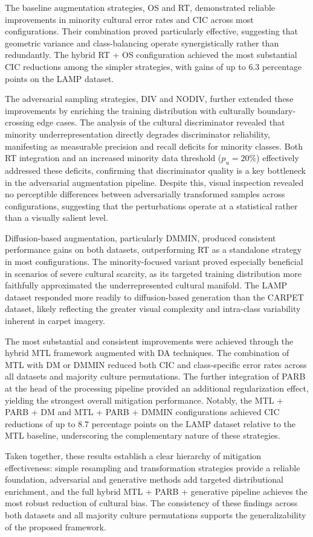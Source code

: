The baseline augmentation strategies, OS and RT, demonstrated reliable improvements in minority cultural error rates and CIC across most configurations. Their combination proved particularly effective, suggesting that geometric variance and class-balancing operate synergistically rather than redundantly. The hybrid RT + OS configuration achieved the most substantial CIC reductions among the simpler strategies, with gains of up to $6.3$ percentage points on the LAMP dataset.

The adversarial sampling strategies, DIV and NODIV, further extended these improvements by enriching the training distribution with culturally boundary-crossing edge cases. The analysis of the cultural discriminator revealed that minority underrepresentation directly degrades discriminator reliability, manifesting as measurable precision and recall deficits for minority classes. Both RT integration and an increased minority data threshold ($p_u = 20\%$) effectively addressed these deficits, confirming that discriminator quality is a key bottleneck in the adversarial augmentation pipeline. Despite this, visual inspection revealed no perceptible differences between adversarially transformed samples across configurations, suggesting that the perturbations operate at a statistical rather than a visually salient level.

Diffusion-based augmentation, particularly DMMIN, produced consistent performance gains on both datasets, outperforming RT as a standalone strategy in most configurations. The minority-focused variant proved especially beneficial in scenarios of severe cultural scarcity, as its targeted training distribution more faithfully approximated the underrepresented cultural manifold. The LAMP dataset responded more readily to diffusion-based generation than the CARPET dataset, likely reflecting the greater visual complexity and intra-class variability inherent in carpet imagery.

The most substantial and consistent improvements were achieved through the hybrid MTL framework augmented with DA techniques. The combination of MTL with DM or DMMIN reduced both CIC and class-specific error rates across all datasets and majority culture permutations. The further integration of PARB at the head of the processing pipeline provided an additional regularization effect, yielding the strongest overall mitigation performance. Notably, the MTL + PARB + DM and MTL + PARB + DMMIN configurations achieved CIC reductions of up to $8.7$ percentage points on the LAMP dataset relative to the MTL baseline, underscoring the complementary nature of these strategies.

Taken together, these results establish a clear hierarchy of mitigation effectiveness: simple resampling and transformation strategies provide a reliable foundation, adversarial and generative methods add targeted distributional enrichment, and the full hybrid MTL + PARB + generative pipeline achieves the most robust reduction of cultural bias. The consistency of these findings across both datasets and all majority culture permutations supports the generalizability of the proposed framework.





